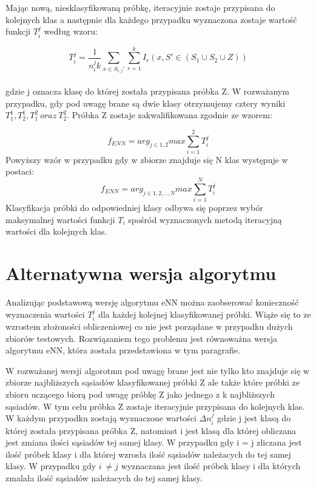 \documentclass[12pt]{report}
\begin{document}
{Mając nową, niesklasyfikowaną próbkę, iteracyjnie zostaje przypisana do kolejnych klas a następnie dla każdego przypadku wyznaczona zostaje wartość funkcji $T_i^j$ według wzoru:

\begin{equation}
T_{i}^{j} = \frac{1}{n_i^j k} {\sum_{x \in S_{i,j}'} \sum_{r=1}^{k} I_r (x,S' \in (S_1 \cup S_2 \cup {Z}))} 
\end{equation}\\
gdzie j oznacza klasę do której została przypisana próbka Z.
W rozważanym przypadku, gdy pod uwagę brane są dwie klasy otrzymujemy cztery wyniki $T_1^1, T_2^1, T_1^2\ oraz\ T_2^2$. Próbka Z zostaje zakwalifikowana zgodnie ze wzorem:

\begin{equation}
f_{ENN} = arg_{j\in1,2} max \sum_{i=1}^{2} T_i^j
\end{equation}
Powyższy wzór w przypadku gdy w zbiorze znajduje się N klas występuje w postaci:
\begin{equation}
f_{ENN} = arg_{j\in1,2,..,N} max \sum_{i=1}^{N} T_i^j
\end{equation}
Klasyfikacja próbki do odpowiedniej klasy odbywa się poprzez wybór maksymalnej wartości funkcji $T_i$ spośród wyznaczonych metodą iteracyjną wartości dla kolejnych klas.

\newpage
\section{Alternatywna wersja algorytmu}
Analizując podstawową wersję algorytmu eNN można zaobserować konieczność wyznaczenia wartości $T_i^j$ dla każdej kolejnej klasyfikowanej próbki. Wiąże się to  ze wzrostem złożoności obliczeniowej co nie jest porządane w przypadku dużych zbiorów testowych. Rozwiązaniem tego problemu jest równoważna wersja algorytmu eNN, która została przedstawiona w tym paragrafie. 

W rozważanej wersji algorotmu pod uwagę brane jest nie tylko kto znajduje się w zbiorze najbliższych sąsiadów klasyfikowanej próbki Z ale także które próbki ze zbioru uczącego biorą pod uwagę próbkę Z jako jednego z k najbliższych sąsiadów. W tym celu próbka Z zostaje iteracyjnie przypisana do kolejnych klas. W każdym przypadku zostają wyznaczone wartości $\Delta n_i^j$ gdzie j jest klasą do której została przypisana próbka Z, natomiast i jest klasą dla której obliczana jest zmiana ilości sąsiadów tej samej klasy. W przypadku gdy i = j zliczana jest ilość próbek klasy i dla której wzrosła ilość sąsiadów należacych do tej samej klasy. W przypadku gdy $i\ \neq j$ wyznaczana jest ilość próbek klasy i dla których zmalała ilość sąsiadów należacych do tej samej klasy.

}
\end{document}
